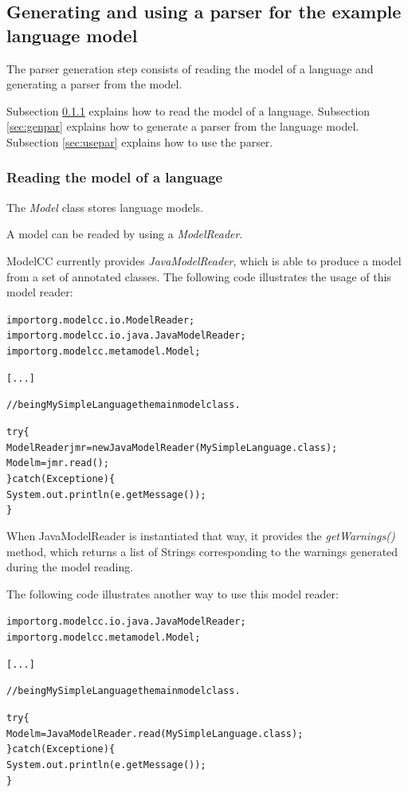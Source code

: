 \documentclass[a4paper,twoside,onecolumn]{article}
\newenvironment{colframe}{%
  \begin{Sbox} 
    \begin{minipage}{.8\columnwidth} 
}{%

  \end{minipage} 
  \end{Sbox} 
  \begin{center} 
    \fcolorbox{black}{MyGray}{\TheSbox} 
  \end{center} 
}
\begin{document}
\subsection{Generating and using a parser for the example language model} \label{sec:generating}

The parser generation step consists of reading the model of a language and generating a parser from the model.

Subsection \ref{sec:reading} explains how to read the model of a language.
Subsection \ref{sec:genpar} explains how to generate a parser from the language model.
Subsection \ref{sec:usepar} explains how to use the parser.

\subsubsection{Reading the model of a language} \label{sec:reading}

The \emph{Model} class stores language models.

A model can be readed by using a \emph{ModelReader}.

ModelCC currently provides \emph{JavaModelReader}, which is able to produce a model from a set of annotated classes. The following code illustrates the usage of this model reader:

\begin{colframe}
\begin{alltt}
import org.modelcc.io.ModelReader;
import org.modelcc.io.java.JavaModelReader;
import org.modelcc.metamodel.Model;


[...]

//being MySimpleLanguage the main model class.

try \{
  ModelReader jmr = new JavaModelReader(MySimpleLanguage.class);
  Model m = jmr.read();
\} catch (Exception e) \{
  System.out.println(e.getMessage());
\}
\end{alltt}
\end{colframe}

When JavaModelReader is instantiated that way, it provides the \emph{getWarnings()} method, which returns a list of Strings corresponding to the warnings generated during the model reading.

The following code illustrates another way to use this model reader:

\begin{colframe}
\begin{alltt}
import org.modelcc.io.java.JavaModelReader;
import org.modelcc.metamodel.Model;

[...]

//being MySimpleLanguage the main model class.

try \{
  Model m = JavaModelReader.read(MySimpleLanguage.class);
\} catch (Exception e) \{
  System.out.println(e.getMessage());
\}
\end{alltt}
\end{colframe}
\end{document}
